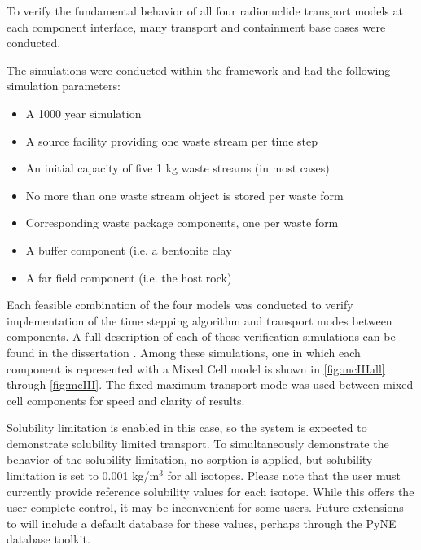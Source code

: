 
To verify the fundamental behavior of all four \Cyder radionuclide transport models at
each component interface, many transport and containment base cases were
conducted.

The simulations were conducted within the \Cyclus framework and had the
following simulation parameters:

\begin{itemize}
\item{A 1000 year simulation}
\item{A source facility providing one waste stream per time step}
\item{An initial capacity of five 1 kg waste streams (in most cases)}
\item{No more than one waste stream object is stored per waste form}
\item{Corresponding waste package components, one per waste form}
\item{A buffer component (i.e. a bentonite clay}
\item{A far field component (i.e. the host rock)}
\end{itemize}


Each feasible combination of the four models was conducted to verify
implementation of the time stepping algorithm and transport modes between
components. A full description of each of these verification simulations can be 
found in the dissertation \cite{huff_integrated_2013}. Among these simulations, 
one in which each component is represented with a Mixed Cell model is shown in 
\ref{fig:mcIIIall} through \ref{fig:mcIII}.  
The fixed maximum transport mode was used between mixed cell components for speed and clarity of results.

Solubility limitation is enabled 
in this case, so the system is expected to demonstrate solubility limited 
transport.  To simultaneously demonstrate the behavior of the solubility 
limitation, no sorption is applied, but solubility limitation is set to 0.001 
kg/m$^3$ for all isotopes.  Please note that the \Cyder user must currently 
provide reference solubility values for each isotope. While this offers the 
user complete control, it may be inconvenient for some users. Future extensions 
to \Cyder will include a default database for these values, perhaps through the 
\gls{PyNE} database toolkit\cite{bates_pyne_2014}. 



\FloatBarrier

